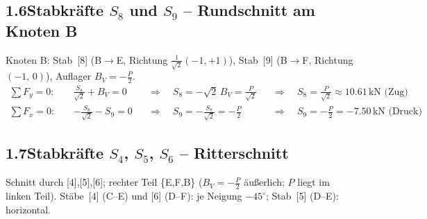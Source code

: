 \documentclass[a4paper,11pt]{article}
\begin{document}
\begin{center}
\end{center}


\subsection*{1.6\quad Stabkräfte $S_8$ und $S_9$ -- Rundschnitt am Knoten B}

Knoten B: Stab~[8] (B$\to$E, Richtung $\tfrac{1}{\sqrt{2}}(-1,+1)$),
Stab~[9] (B$\to$F, Richtung $(-1,\,0)$), Auflager $B_V = -\tfrac{P}{2}$.
\begin{align*}
  \sum F_y = 0:\quad & \tfrac{S_8}{\sqrt{2}} + B_V = 0
    &&\Rightarrow\quad S_8 = -\sqrt{2}\,B_V = \tfrac{P}{\sqrt{2}}
       &&\Rightarrow\quad \boxed{S_8 = \tfrac{P}{\sqrt{2}} \approx 10.61\,\text{kN (Zug)}} \\
  \sum F_x = 0:\quad & -\tfrac{S_8}{\sqrt{2}} - S_9 = 0
    &&\Rightarrow\quad S_9 = -\tfrac{S_8}{\sqrt{2}} = -\tfrac{P}{2}
       &&\Rightarrow\quad \boxed{S_9 = -\tfrac{P}{2} = -7.50\,\text{kN (Druck)}}
\end{align*}

\subsection*{1.7\quad Stabkräfte $S_4$, $S_5$, $S_6$ -- Ritterschnitt}

Schnitt durch [4],[5],[6]; rechter Teil \{E,F,B\} ($B_V = -\tfrac{P}{2}$ äußerlich; $P$ liegt im linken Teil).
Stäbe~[4] (C--E) und [6] (D--F): je Neigung $-45^\circ$; Stab~[5] (D--E): horizontal.
\end{document}
